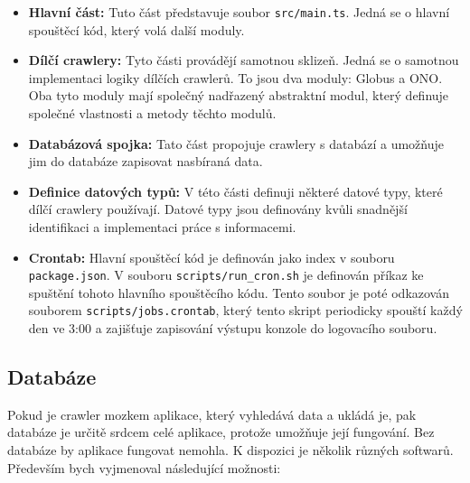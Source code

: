 \begin{itemize}
    \item \textbf{Hlavní část:} Tuto část představuje soubor \texttt{src/main.ts}.
        Jedná se o hlavní spouštěcí kód, který volá další moduly.
    \item \textbf{Dílčí crawlery:} Tyto části provádějí samotnou sklizeň. Jedná se
        o samotnou implementaci logiky dílčích crawlerů. To jsou dva moduly: Globus
        a ONO. Oba tyto moduly mají společný nadřazený abstraktní modul, který
        definuje společné vlastnosti a metody těchto modulů.
    \item \textbf{Databázová spojka:} Tato část propojuje crawlery s databází
        a umožňuje jim do databáze zapisovat nasbíraná data.
    \item \textbf{Definice datových typů:} V této části definuji některé datové
        typy, které dílčí crawlery používají. Datové typy jsou definovány kvůli
        snadnější identifikaci a implementaci práce s informacemi.
    \item \textbf{Crontab:} Hlavní spouštěcí kód je definován jako index
        v souboru \texttt{package.json}. V souboru \texttt{scripts/run\_cron.sh}
        je definován příkaz ke spuštění tohoto hlavního spouštěcího kódu. Tento
        soubor je poté odkazován souborem \texttt{scripts/jobs.crontab},
        který tento skript periodicky spouští každý den ve 3:00 a zajišťuje
        zapisování výstupu konzole do logovacího souboru.
\end{itemize}

\subsection{Databáze}

Pokud je crawler mozkem aplikace, který vyhledává data a ukládá je,
pak databáze je určitě srdcem celé aplikace, protože umožňuje její fungování.
Bez databáze by aplikace fungovat nemohla. K dispozici je několik různých
softwarů. Především bych vyjmenoval následující možnosti:

